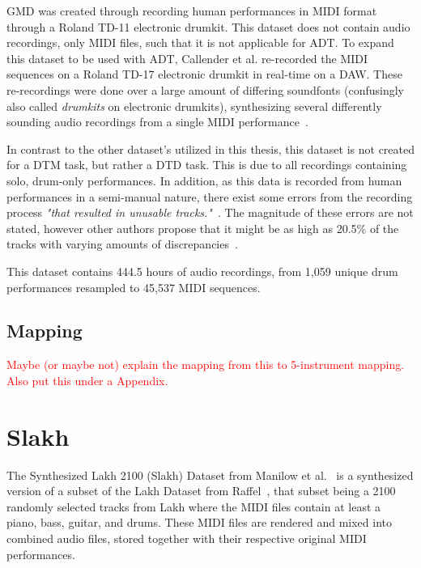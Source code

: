 GMD was created through recording human performances in MIDI format through a Roland TD-11 electronic drumkit. This dataset does not contain audio recordings, only MIDI files, such that it is not applicable for \gls{ADT}. To expand this dataset to be used with \gls{ADT}, Callender et al. re-recorded the MIDI sequences on a Roland TD-17 electronic drumkit in real-time on a \gls{DAW}. These re-recordings were done over a large amount of differing soundfonts (confusingly also called \textit{drumkits} on electronic drumkits), synthesizing several differently sounding audio recordings from a single MIDI performance~\cite{pmlr-v97-gillick19a, callender2020improving}.

In contrast to the other dataset's utilized in this thesis, this dataset is not created for a \gls{DTM} task, but rather a \gls{DTD} task. This is due to all recordings containing solo, drum-only performances. In addition, as this data is recorded from human performances in a semi-manual nature, there exist some errors from the recording process \textit{"that resulted in unusable tracks."}~\cite{callender2020improving}. The magnitude of these errors are not stated, however other authors propose that it might be as high as 20.5\% of the tracks with varying amounts of discrepancies~\cite{holz2021automatic}.

This dataset contains 444.5 hours of audio recordings, from 1,059 unique drum performances resampled to 45,537 MIDI sequences.

\subsection{Mapping}

\textcolor{red}{Maybe (or maybe not) explain the mapping from this to 5-instrument mapping. Also put this under a Appendix.}

\section{Slakh}

The Synthesized Lakh 2100 (Slakh) Dataset from Manilow et al.~\cite{8937170} is a synthesized version of a subset of the Lakh Dataset from Raffel~\cite{raffel2016learning}, that subset being a 2100 randomly selected tracks from Lakh where the MIDI files contain at least a piano, bass, guitar, and drums. These MIDI files are rendered and mixed into combined audio files, stored together with their respective original MIDI performances.

